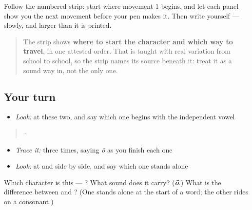 Follow the numbered strip: start where movement 1 begins, and let each panel show you the next movement before your pen makes it. Then write  yourself — slowly, and larger than it is printed.

\begin{quote}
The strip shows \textbf{where to start the character and which way to travel}, in one attested order. That is taught with real variation from school to school, so the strip names its source beneath it: treat it as a sound way in, not the only one.
\end{quote}

\subsection*{Your turn}
\begin{itemize}
\raggedright
  \item \emph{Look:} at these two, and say which one begins with the independent vowel
\end{itemize}

\begin{quote}
  ·  
\end{quote}

\begin{itemize}
\raggedright
  \item \emph{Trace it:}  three times, saying \emph{ō} as you finish each one
  \item \emph{Look:} at  and  side by side, and say which one stands alone
\end{itemize}

\begin{tcolorbox}[breakable,colback=teal!4,colframe=teal!35!black,title={Before you move on}]
Which character is this — ? What sound does it carry? (\emph{\textbf{ō}}.) What is the difference between  and ? (One stands alone at the start of a word; the other rides on a consonant.)
\end{tcolorbox}
